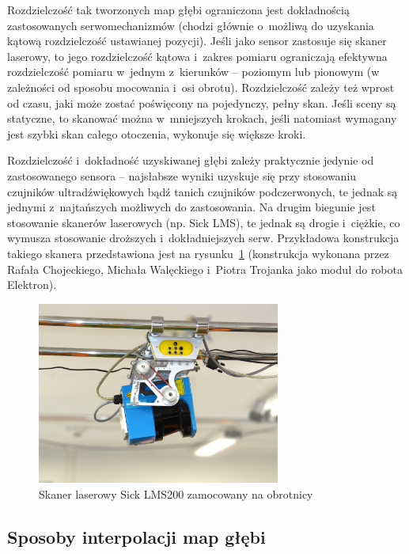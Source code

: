 Rozdzielczość tak tworzonych map głębi ograniczona jest dokładnością
zastosowanych serwomechanizmów (chodzi głównie o~możliwą do uzyskania
kątową rozdzielczość ustawianej pozycji). Jeśli jako sensor zastosuje się
skaner laserowy, to jego rozdzielczość kątowa i~zakres pomiaru ograniczają
efektywna rozdzielczość pomiaru w~jednym z~kierunków -- poziomym lub pionowym
(w zależności od sposobu mocowania i~osi obrotu). Rozdzielczość zależy też
wprost od czasu, jaki może zostać poświęcony na pojedynczy, pełny skan. Jeśli
sceny są statyczne, to skanować można w~mniejszych krokach, jeśli natomiast
wymagany jest szybki skan całego otoczenia, wykonuje się większe kroki.

Rozdzielczość i~dokładność uzyskiwanej głębi zależy praktycznie jedynie od
zastosowanego sensora -- najsłabsze wyniki uzyskuje się przy stosowaniu
czujników ultradźwiękowych bądź tanich czujników podczerwonych, te jednak są
jednymi z~najtańszych możliwych do zastosowania. Na drugim biegunie jest
stosowanie skanerów laserowych (np. Sick LMS), te jednak są drogie i~ciężkie, co
wymusza stosowanie droższych i~dokładniejszych serw. Przykładowa konstrukcja
takiego skanera przedstawiona jest na rysunku~\ref{fig:sick_obrotnica}
(konstrukcja wykonana przez Rafała Chojeckiego, Michała Walęckiego i~Piotra
Trojanka jako moduł do robota Elektron).

\begin{figure}[h!]
\centering
\includegraphics[height=6cm]{../../Common/img/sick_obrotnica}
\caption{Skaner laserowy Sick LMS200 zamocowany na obrotnicy}
\label{fig:sick_obrotnica}
\end{figure}

\subsection{Sposoby interpolacji map głębi}

